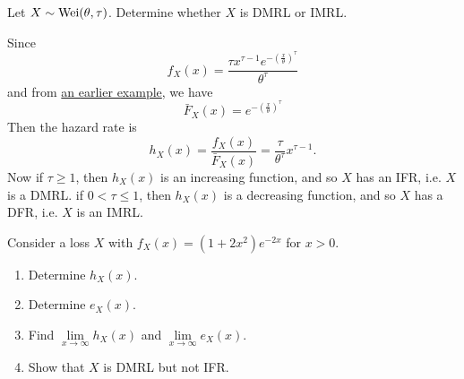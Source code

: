\documentclass[notoc,notitlepage]{tufte-book}
\begin{document}
\begin{eg}
  Let $X \sim \operatorname{Wei}(\theta, \tau)$. Determine whether $X$ is DMRL or IMRL.
\end{eg}

\begin{solution}
  Since
  \begin{equation*}
    f_X(x) = \frac{\tau x^{\tau - 1} e^{-{\left( \frac{x}{\theta} \right)}^\tau}}{\theta^\tau}
  \end{equation*}
  and from \hyperref[note:weibull_survival_function]{an earlier example}, we have
  \begin{equation*}
    \bar{F}_X(x) = e^{- {\left( \frac{x}{\theta} \right)}^\tau}
  \end{equation*}
  Then the hazard rate is
  \begin{equation*}
    h_X(x) = \frac{f_X(x)}{\bar{F}_X(x)} = \frac{\tau}{\theta^\tau} x^{\tau - 1}.
  \end{equation*}
  Now if $\tau \geq 1$, then $h_X(x)$ is an increasing function, and so $X$ has an IFR, i.e. $X$ is a DMRL. if $0 < \tau \leq 1$, then $h_X(x)$ is a decreasing function, and so $X$ has a DFR, i.e. $X$ is an IMRL.
\end{solution}

\begin{eg}
  Consider a loss $X$ with $f_X(x) = (1 + 2x^2) e^{-2x}$ for $x > 0$.
  \begin{enumerate}
    \item Determine $h_X(x)$.
    \item Determine $e_X(x)$.
    \item Find $\lim\limits_{x \to \infty} h_X(x)$ and $\lim\limits_{x \to \infty} e_X(x)$.
    \item Show that $X$ is DMRL but not IFR.
  \end{enumerate}
\end{eg}
\end{document}
